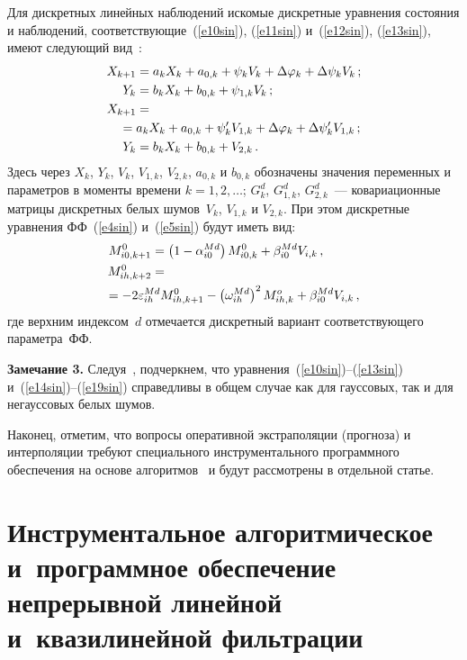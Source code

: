 \begin{multicols}{2}
Для дискретных линейных наблюдений искомые дискретные уравнения состояния и наблюдений, 
соответствующие~(\ref{e10sin}), (\ref{e11sin}) и~(\ref{e12sin}), (\ref{e13sin}), имеют следующий вид~\cite{4sin}:
\begin{align}
X_{k+1} &= a_k X_k + a_{0,k} +\psi_k V_k +\Delta \vrp_k +\Delta \psi_k V_k\,;\label{e14sin}\\
Y_k &= b_k X_k + b_{0,k} +\psi_{1,k}V_k\,;\label{e15sin}\\
X_{k+1} &={}\notag \\
&\!\!\!\!\!\!\!\!{}=a_k X_k + a_{0,k} +\psi_k' V_{1,k} +\Delta \vrp_k +\Delta \psi_k' V_{1,k}\,;\label{e16sin}\\
Y_k &= b_k X_k + b_{0,k} +V_{2,k}\,.\label{e17sin}
\end{align}
Здесь через $X_k$, $Y_k$, $V_k$, $V_{1,k}$, $V_{2,k}$, $a_{0,k}$ и $b_{0,k}$ 
обозначены значения переменных и параметров в моменты времени $k=1,2,\ldots$; 
$G_k^d$, $G_{1,k}^d$, $G_{2,k}^d$~--- ковариационные матрицы дискретных белых шумов~$V_k$, $V_{1,k}$ и $V_{2,k}$. 
При этом дискретные уравнения ФФ~(\ref{e4sin}) и~(\ref{e5sin}) будут иметь вид:
\begin{align}
M_{i0, k+1}^0 &= \left(1-\alp_{i0}^{Md}\right) M_{i0,k}^0 + \beta_{i0}^{Md} V_{i,k}\,,\label{e18sin}\\
M_{ih, k+2}^0 &={}\notag\\
&\!\!\!\!\!\!\!\!\!\!\!\!\!\!\!\!\!\!\!\!\!\!{}= -2\eps_{ih}^{Md} M_{ih, k+1}^0 -\left(\w_{ih}^{Md}\right)^2 M_{ih,k}^o +\beta_{i0}^{Md} V_{i,k}\,,\label{e19sin}
\end{align}
где верхним индексом~$d$ отмечается дискретный вариант соответствующего па\-ра\-мет\-ра~ФФ.

\smallskip

\noindent
\textbf{Замечание 3.} Следуя~\cite{4sin}, подчеркнем, что уравнения~(\ref{e10sin})--(\ref{e13sin}) 
и~(\ref{e14sin})--(\ref{e19sin}) справедливы в общем случае как для гауссовых, так и для
негауссовых белых шумов.
 \smallskip

Наконец, отметим, что вопросы оперативной экстраполяции (прогноза) и интерполяции требуют 
специального инструментального программного обеспечения на основе алгоритмов~\cite{4sin, 5sin} 
и будут рассмотрены в отдельной статье.

\section{Инструментальное алгоритмическое и~программное обеспечение непрерывной линейной и~квазилинейной фильтрации}


\end{multicols}

